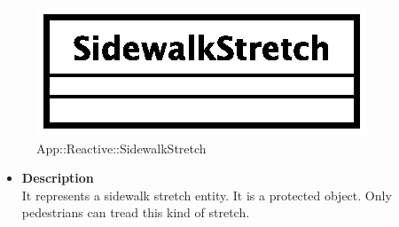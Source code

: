 \begin{figure}[h]
\centering
\includegraphics[scale=0.6,keepaspectratio]{images/solution/sidewalk_stretch.eps}
\caption{App::Reactive::SidewalkStretch}
\label{fig:sd-app-sidewalk_stretch}
\end{figure}
\FloatBarrier
\begin{itemize}
  \item \textbf{Description} \\
    It represents a sidewalk stretch entity. It is a protected object. Only pedestrians
can tread this kind of stretch.
\end{itemize}
